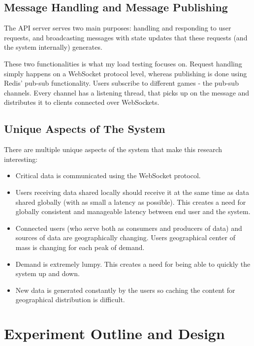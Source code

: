 \documentclass{uvamscse}
\begin{document}
\section{Message Handling and Message Publishing}

The API server serves two main purposes: handling and responding to user requests, and broadcasting messages with state updates that these requests (and the system internally) generates.

These two functionalities is what my load testing focuses on. Request handling simply happens on a WebSocket protocol level, whereas publishing is done using Redis' pub-sub functionality. Users subscribe to different games - the pub-sub channels. Every channel has a listening thread, that picks up on the message and distributes it to clients connected over WebSockets.

\section{Unique Aspects of The System}

There are multiple unique aspects of the system that make this research interesting:

\begin{itemize}
  \item Critical data is communicated using the WebSocket protocol.
  \item Users receiving data shared locally should receive it at the same time as data shared globally (with as small a latency as possible). This creates a need for globally consistent and manageable latency between end user and the system.
  \item Connected users (who serve both as consumers and producers of data) and sources of data are geographically changing. Users geographical center of mass is changing for each peak of demand.
  \item Demand is extremely lumpy. This creates a need for being able to quickly the system up and down.
  \item New data is generated constantly by the users so caching the content for geographical distribution is difficult.
\end{itemize}


\chapter{Experiment Outline and Design} \label{Experiment Outline and Design}
\end{document}
